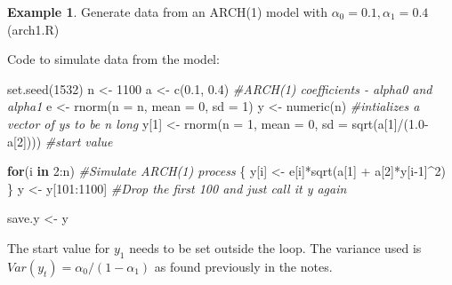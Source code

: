\documentclass[
]{book}
\newenvironment{Shaded}{\begin{snugshade}}{\end{snugshade}}
\newcommand{\AttributeTok}[1]{\textcolor[rgb]{0.77,0.63,0.00}{#1}}
\newcommand{\CommentTok}[1]{\textcolor[rgb]{0.56,0.35,0.01}{\textit{#1}}}
\newcommand{\ControlFlowTok}[1]{\textcolor[rgb]{0.13,0.29,0.53}{\textbf{#1}}}
\newcommand{\DecValTok}[1]{\textcolor[rgb]{0.00,0.00,0.81}{#1}}
\newcommand{\FloatTok}[1]{\textcolor[rgb]{0.00,0.00,0.81}{#1}}
\newcommand{\FunctionTok}[1]{\textcolor[rgb]{0.00,0.00,0.00}{#1}}
\newcommand{\NormalTok}[1]{#1}
\newcommand{\OtherTok}[1]{\textcolor[rgb]{0.56,0.35,0.01}{#1}}
\newcommand{\SpecialCharTok}[1]{\textcolor[rgb]{0.00,0.00,0.00}{#1}}
\theoremstyle{definition}
\theoremstyle{definition}
\newtheorem{example}{Example}[chapter]
\theoremstyle{definition}
\theoremstyle{definition}
\theoremstyle{remark}
\begin{document}
\begin{example}

Generate data from an ARCH(1) model with \(\alpha_0=0.1, \alpha_1=0.4\) (arch1.R)

Code to simulate data from the model:

\begin{Shaded}
\begin{Highlighting}[]
\FunctionTok{set.seed}\NormalTok{(}\DecValTok{1532}\NormalTok{)}
\NormalTok{n }\OtherTok{\textless{}{-}} \DecValTok{1100}
\NormalTok{a }\OtherTok{\textless{}{-}} \FunctionTok{c}\NormalTok{(}\FloatTok{0.1}\NormalTok{, }\FloatTok{0.4}\NormalTok{)  }\CommentTok{\#ARCH(1) coefficients {-} alpha0 and alpha1}
\NormalTok{e }\OtherTok{\textless{}{-}} \FunctionTok{rnorm}\NormalTok{(}\AttributeTok{n =}\NormalTok{ n, }\AttributeTok{mean =} \DecValTok{0}\NormalTok{, }\AttributeTok{sd =} \DecValTok{1}\NormalTok{)}
\NormalTok{y }\OtherTok{\textless{}{-}} \FunctionTok{numeric}\NormalTok{(n)   }\CommentTok{\#intializes a vector of y\textquotesingle{}s to be n long}
\NormalTok{y[}\DecValTok{1}\NormalTok{] }\OtherTok{\textless{}{-}} \FunctionTok{rnorm}\NormalTok{(}\AttributeTok{n =} \DecValTok{1}\NormalTok{, }\AttributeTok{mean =} \DecValTok{0}\NormalTok{, }\AttributeTok{sd =} \FunctionTok{sqrt}\NormalTok{(a[}\DecValTok{1}\NormalTok{]}\SpecialCharTok{/}\NormalTok{(}\FloatTok{1.0}\SpecialCharTok{{-}}\NormalTok{a[}\DecValTok{2}\NormalTok{]))) }
                                              \CommentTok{\#start value}

\ControlFlowTok{for}\NormalTok{(i }\ControlFlowTok{in} \DecValTok{2}\SpecialCharTok{:}\NormalTok{n)     }\CommentTok{\#Simulate ARCH(1) process}
\NormalTok{ \{}
\NormalTok{  y[i] }\OtherTok{\textless{}{-}}\NormalTok{ e[i]}\SpecialCharTok{*}\FunctionTok{sqrt}\NormalTok{(a[}\DecValTok{1}\NormalTok{] }\SpecialCharTok{+}\NormalTok{ a[}\DecValTok{2}\NormalTok{]}\SpecialCharTok{*}\NormalTok{y[i}\DecValTok{{-}1}\NormalTok{]}\SpecialCharTok{\^{}}\DecValTok{2}\NormalTok{)}
\NormalTok{ \}}
\NormalTok{y }\OtherTok{\textless{}{-}}\NormalTok{ y[}\DecValTok{101}\SpecialCharTok{:}\DecValTok{1100}\NormalTok{]    }\CommentTok{\#Drop the first 100 and just call it y again}

\NormalTok{save.y }\OtherTok{\textless{}{-}}\NormalTok{ y}
\end{Highlighting}
\end{Shaded}

The start value for \(y_1\) needs to be set outside the loop. The variance used is \(Var(y_t) = \alpha_0/(1-\alpha_1)\) as found previously in the notes.


\end{example}
\end{document}
